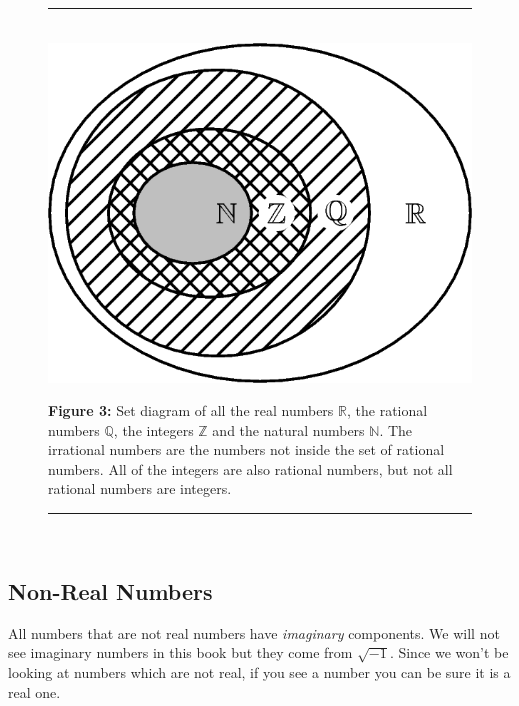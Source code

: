     \setcounter{subfigure}{0}
	\begin{figure}[H] %
    \begin{center}
    \rule[.1in]{\figurerulewidth}{.005in} \\
        \label{m38346*uid53!!!underscore!!!media}\label{m38346*uid53!!!underscore!!!printimage}\includegraphics{col11306.imgs/m38346_MG10C2_003.png} %
      \vspace{2pt}
    \vspace{\rubberspace}\par \begin{cnxcaption}
	  \small \textbf{Figure 3: }Set diagram of all the real numbers $\mathbb{R}$, the rational
numbers $\mathbb{Q}$, the integers $\mathbb{Z}$ and the natural numbers $\mathbb{N}$. The irrational numbers are the numbers not inside the set of rational
numbers. All of the integers are also rational numbers, but not all rational
numbers are integers.
	\end{cnxcaption}
    \vspace{.1in}
    \rule[.1in]{\figurerulewidth}{.005in} \\
    \end{center}
 \end{figure}       
\label{m38346*secfhsst!!!underscore!!!id2036}
            \subsection{  Non-Real Numbers }
            \nopagebreak
      \label{m38346*id178383}All numbers that are not real numbers have
\textsl{imaginary} components. We will not see imaginary numbers in this book
but they come from $\sqrt{-1}$. Since we won't be looking at
numbers which are not real, if you see a number you can be sure it is a real
one. \par 
      \label{m38346*uid54}
